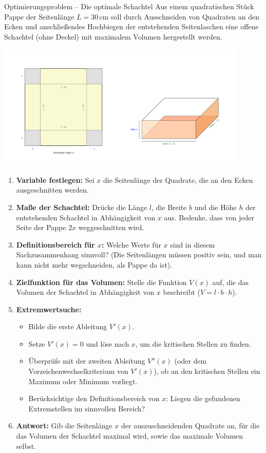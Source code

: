 \begin{aufgabenumgebung}{Optimierungsproblem – Die optimale Schachtel}
Aus einem quadratischen Stück Pappe der Seitenlänge $L=30\,$cm soll durch Ausschneiden von Quadraten an den Ecken und anschließendes Hochbiegen der entstehenden Seitenlaschen eine offene Schachtel (ohne Deckel) mit maximalem Volumen hergestellt werden.

\begin{center} %
    \includegraphics[width=0.9\textwidth]{grafiken/Optimierung_Schachtel.png}
    \label{fig:optimierung_schachtel}
\end{center}
\begin{enumerate}
    \item \textbf{Variable festlegen:} Sei $x$ die Seitenlänge der Quadrate, die an den Ecken ausgeschnitten werden.
    \item \textbf{Maße der Schachtel:} Drücke die Länge $l$, die Breite $b$ und die Höhe $h$ der entstehenden Schachtel in Abhängigkeit von $x$ aus. Bedenke, dass von jeder Seite der Pappe $2x$ weggeschnitten wird.
    \item \textbf{Definitionsbereich für $x$:} Welche Werte für $x$ sind in diesem Sachzusammenhang sinnvoll? (Die Seitenlängen müssen positiv sein, und man kann nicht mehr wegschneiden, als Pappe da ist).
    \item \textbf{Zielfunktion für das Volumen:} Stelle die Funktion $V(x)$ auf, die das Volumen der Schachtel in Abhängigkeit von $x$ beschreibt ($V = l \cdot b \cdot h$).
    \item \textbf{Extremwertsuche:}
        \begin{itemize}
            \item Bilde die erste Ableitung $V'(x)$.
            \item Setze $V'(x)=0$ und löse nach $x$, um die kritischen Stellen zu finden.
            \item Überprüfe mit der zweiten Ableitung $V''(x)$ (oder dem Vorzeichenwechselkriterium von $V'(x)$), ob an den kritischen Stellen ein Maximum oder Minimum vorliegt.
            \item Berücksichtige den Definitionsbereich von $x$: Liegen die gefundenen Extremstellen im sinnvollen Bereich?
        \end{itemize}
    \item \textbf{Antwort:} Gib die Seitenlänge $x$ der auszuschneidenden Quadrate an, für die das Volumen der Schachtel maximal wird, sowie das maximale Volumen selbst.
\end{enumerate}
\end{aufgabenumgebung}

